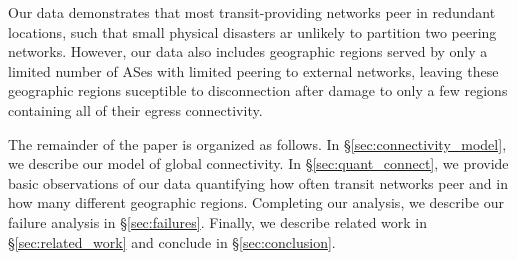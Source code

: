         Our data demonstrates that most transit-providing networks peer in redundant locations, such that small physical disasters ar unlikely to partition two peering networks.    
    However, our data also includes geographic regions served by only a limited number of ASes with limited peering to external networks, leaving these geographic regions suceptible to disconnection after damage to only a few regions containing all of their egress connectivity.
 
The remainder of the paper is organized as follows. In \S\ref{sec:connectivity_model}, we describe our model of global connectivity.
In \S\ref{sec:quant_connect}, we provide basic observations of our data quantifying how often transit networks peer and in how many different geographic regions.
Completing our analysis, we describe our failure analysis in \S\ref{sec:failures}.
Finally, we describe related work in  \S\ref{sec:related_work} and conclude in \S\ref{sec:conclusion}.

